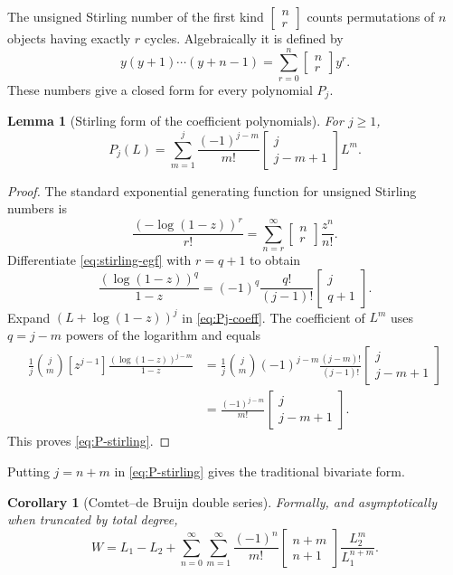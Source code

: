 \documentclass[11pt]{article}
\numberwithin{equation}{section}
\newtheorem{lemma}[theorem]{Lemma}
\newtheorem{corollary}[theorem]{Corollary}
\theoremstyle{definition}
\theoremstyle{remark}
\newcommand{\stirlingone}[2]{\left[\begin{matrix}#1\\#2\end{matrix}\right]}
\begin{document}
The unsigned Stirling number of the first kind
$\stirlingone{n}{r}$ counts permutations of $n$ objects having exactly $r$
cycles.  Algebraically it is defined by
\begin{equation}
  y(y+1)\cdots(y+n-1)
    =\sum_{r=0}^{n}\stirlingone{n}{r}y^r.             \label{eq:stirling-definition}
\end{equation}
These numbers give a closed form for every polynomial $P_j$.

\begin{lemma}[Stirling form of the coefficient polynomials]
\label{lem:P-stirling}
For $j\ge1$,
\begin{equation}
 P_j(L)=\sum_{m=1}^{j}
   \frac{(-1)^{j-m}}{m!}
   \stirlingone{j}{j-m+1}L^m.                         \label{eq:P-stirling}
\end{equation}
\end{lemma}

\begin{proof}
The standard exponential generating function for unsigned Stirling numbers is
\begin{equation}
 \frac{(-\log(1-z))^r}{r!}
   =\sum_{n=r}^{\infty}\stirlingone{n}{r}\frac{z^n}{n!}.
                                                               \label{eq:stirling-egf}
\end{equation}
Differentiate \eqref{eq:stirling-egf} with $r=q+1$ to obtain
\begin{equation}
 [z^{j-1}]\frac{(\log(1-z))^q}{1-z}
  =(-1)^q\frac{q!}{(j-1)!}\stirlingone{j}{q+1}.       \label{eq:log-power-coeff}
\end{equation}
Expand $(L+\log(1-z))^j$ in \eqref{eq:Pj-coeff}.  The coefficient of $L^m$
uses $q=j-m$ powers of the logarithm and equals
\begin{align*}
 \frac1j\binom jm
 [z^{j-1}]\frac{(\log(1-z))^{j-m}}{1-z}
 &=\frac1j\binom jm(-1)^{j-m}
   \frac{(j-m)!}{(j-1)!}\stirlingone{j}{j-m+1}\\
 &=\frac{(-1)^{j-m}}{m!}\stirlingone{j}{j-m+1}.
\end{align*}
This proves \eqref{eq:P-stirling}.
\end{proof}

Putting $j=n+m$ in \eqref{eq:P-stirling} gives the traditional bivariate form.

\begin{corollary}[Comtet--de Bruijn double series]
\label{cor:double-asymptotic}
Formally, and asymptotically when truncated by total degree,
\begin{equation}
 W=L_1-L_2+
 \sum_{n=0}^{\infty}\sum_{m=1}^{\infty}
 \frac{(-1)^n}{m!}\stirlingone{n+m}{n+1}
 \frac{L_2^m}{L_1^{n+m}}.                             \label{eq:double-asymptotic}
\end{equation}
\end{corollary}
\end{document}
